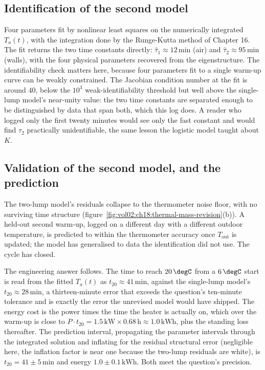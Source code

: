 \subsection{Identification of the second model}

Four parameters fit by nonlinear least squares on the numerically
integrated $T_a(t)$, with the integration done by the Runge-Kutta
method of Chapter 16. The fit returns the two time constants directly:
$\hat\tau_1 \approx 12\,\text{min}$ (air) and $\hat\tau_2 \approx
95\,\text{min}$ (walls), with the four physical parameters recovered
from the eigenstructure. The identifiability check matters here, because
four parameters fit to a single warm-up curve can be weakly
constrained. The Jacobian condition number at the fit is around $40$,
below the $10^3$ weak-identifiability threshold but well above the
single-lump model's near-unity value: the two time constants are
separated enough to be distinguished by data that span both, which this
log does. A reader who logged only the first twenty minutes would see
only the fast constant and would find $\tau_2$ practically
unidentifiable, the same lesson the logistic model taught about $K$.

\subsection{Validation of the second model, and the prediction}

The two-lump model's residuals collapse to the thermometer noise floor,
with no surviving time structure
(figure~\ref{fig:vol02:ch18:thermal-mass-revision}(b)). A held-out
second warm-up, logged on a different day with a different outdoor
temperature, is predicted to within the thermometer accuracy once
$T_{\text{out}}$ is updated; the model has generalised to data the
identification did not use. The cycle has closed.

The engineering answer follows. The time to reach $20\,\degC$ from a
$6\,\degC$ start is read from the fitted $T_a(t)$ as
$t_{20} \approx 41\,\text{min}$, against the single-lump model's
$t_{20} \approx 28\,\text{min}$, a thirteen-minute error that exceeds
the question's ten-minute tolerance and is exactly the error the
unrevised model would have shipped. The energy cost is the power times
the time the heater is actually on, which over the warm-up is close to
$P \cdot t_{20} = 1.5\,\text{kW} \times 0.68\,\text{h} \approx
1.0\,\text{kWh}$, plus the standing loss thereafter. The prediction
interval, propagating the parameter intervals through the integrated
solution and inflating for the residual structural error (negligible
here, the inflation factor is near one because the two-lump residuals
are white), is $t_{20} = 41 \pm 5\,\text{min}$ and energy $1.0 \pm
0.1\,\text{kWh}$. Both meet the question's precision.

